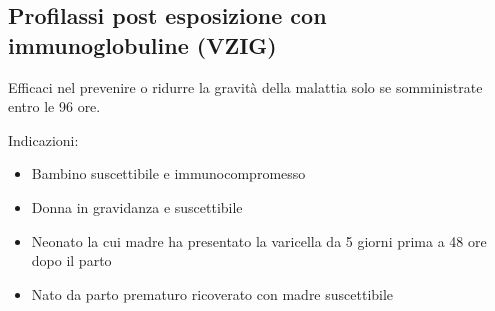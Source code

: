\subsection{Profilassi post esposizione con immunoglobuline (VZIG)}

Efficaci nel prevenire o ridurre la gravità della malattia solo se
somministrate entro le 96 ore.

Indicazioni:

\begin{itemize}
\item
  Bambino suscettibile e immunocompromesso
\item
  Donna in gravidanza e suscettibile
\item
  Neonato la cui madre ha presentato la varicella da 5 giorni prima a 48
  ore dopo il parto
\item
  Nato da parto prematuro ricoverato con madre suscettibile
\end{itemize}